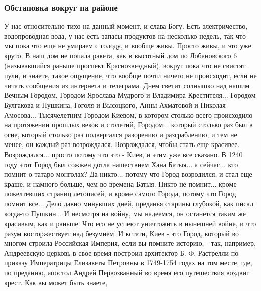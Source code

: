  
 
 
 
 

\subsubsection{Обстановка вокруг на районе}

У нас относительно тихо на данный момент,
и слава Богу. Есть электричество, водопроводная вода, у нас есть запасы
продуктов на несколько недель, так что мы пока что еще не умираем с голоду, и
вообще живы. Просто живы, и это уже круто.  В наш дом не попала ракета, как в
высотный дом по Лобановского 6 (называвшийся раньше проспект Краснозвездный),
вокруг пока что не свистят пули, и знаете, такое ощущение, что вообще почти
ничего не происходит, если не читать сообщения из интернета и телеграма.  Днем
светит солнышко над нашим Вечным Городом, Городом Ярослава Мудрого и Владимира
Крестителя... Городом Булгакова и Пушкина, Гоголя и Высоцкого, Анны Ахматовой и
Николая Амосова... Тысячелетним Городом Киевом, в котором столько всего
происходило на протяжении прошлых веков и столетий, Городом... который столько раз был в
огне, который столько раз подвергался разорению и разграблению, и тем не менее,
он каждый раз возрождался. Возрождался, чтобы стать еще красивее. Возрождался... 
просто потому что это - Киев, и этим уже все сказано. В 1240 году
этот Город был сожжен дотла нашествием Хана Батыя... а сейчас... кто помнит о
татаро-монголах?  Да никто...  потому что Город возродился, и стал еще краше, и
намного больше, чем во времена Батыя.  Никто не помнит... кроме пожелтевших
страниц летописей, и кроме самого Города, потому что Город помнит все... Дело
давно минувших дней, преданья старины глубокой, как писал когда-то Пушкин... И
несмотря на войну, мы надеемся, он останется таким же красивым, как и раньше.
Что его не успеют уничтожить в нынешней войне, и что разум восторжествует над
безумием.  И кстати, Киев - это Город, который во многом строила Российская
Империя, если вы помните историю, - так, например, Андреевскую церковь в свое
время построил архитектор Б. Ф. Растрелли по приказу Императрицы Елизаветы
Петровны в 1749-1754 годах на том месте, где, по преданию, апостол Андрей
Первозванный во время его путешествия воздвиг крест. Как вы может быть знаете,
